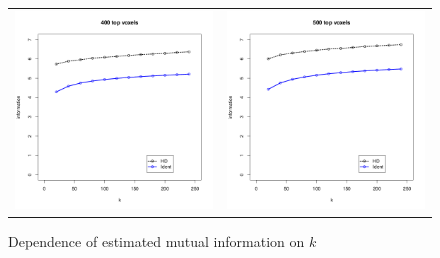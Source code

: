 \begin{figure}
\begin{tabular}{cc}
\includegraphics[scale = 0.4]{../../Yuval/ident_infer4_edited.png} &
\includegraphics[scale = 0.4]{../../Yuval/ident_infer5_edited.png}
\end{tabular}
\caption{Dependence of estimated mutual information on $k$}
\label{fig:dependence_k}
\end{figure}


